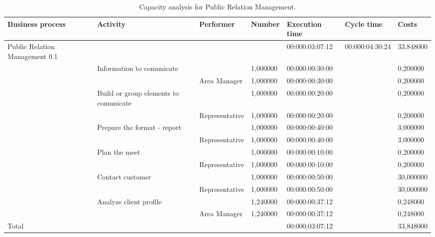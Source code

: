 \begin{landscape}
\centering
\begin{table}
{\tiny
\begin{tabular}{|l|l|l|l|l|l|l|}
Business process&Activity&Performer&Number&Execution time&Cycle time&Costs\\
\hline
Public Relation Management 0.1&&&&00:000:03:07:12&00:000:04:30:24&33,848000\\
\hline
&Information to comunicate &&1,000000&00:000:00:30:00&&0,200000\\
\hline
&&Area Manager &1,000000&00:000:00:30:00&&0,200000\\
\hline
&Build or group elements to comunicate &&1,000000&00:000:00:20:00&&0,200000\\
\hline
&&Representative &1,000000&00:000:00:20:00&&0,200000\\
\hline
&Prepare the format - report &&1,000000&00:000:00:40:00&&3,000000\\
\hline
&&Representative &1,000000&00:000:00:40:00&&3,000000\\
\hline
&Plan the meet &&1,000000&00:000:00:10:00&&0,200000\\
\hline
&&Representative &1,000000&00:000:00:10:00&&0,200000\\
\hline
&Contact customer &&1,000000&00:000:00:50:00&&30,000000\\
\hline
&&Representative &1,000000&00:000:00:50:00&&30,000000\\
\hline
&Analyze client profile &&1,240000&00:000:00:37:12&&0,248000\\
\hline
&&Area Manager &1,240000&00:000:00:37:12&&0,248000\\
\hline
Total&&&&00:000:03:07:12&&33,848000\\
\end{tabular}
}
\caption{Capacity analysis for Public Relation Management.}
\end{table}
\end{landscape}
%

%